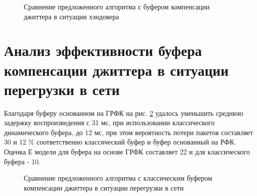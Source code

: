\pgfplotsset{width=15cm, height=10cm, compat=1.3}
\begin{figure} [!h]
  \center
{}
\caption{Сравнение предложенного алгоритма с буфером компенсации джиттера \cite{Ramjee} в ситуации хэндовера}
  \label{img4:handBuff}
\end{figure}


\section{Анализ эффективности буфера компенсации джиттера в ситуации перегрузки в сети} \label{sect4}

Благодаря буферу основанном на ГРФК на рис. \ref{img4:congBuff} удалось уменьшить среднюю задержку воспроизведения с 31 мс, при использовании классического динамического буфера, до 12 мс, при этом вероятность потери пакетов составляет 30 и 12 \% соответственно классический буфер и буфер основанный на РФК. Оценка Е модели для буфера на основе ГРФК составляет 22 и для классического буфера - 10.


\pgfplotsset{width=15cm, height=10cm, compat=1.3}
\begin{figure} [h]
  \center
{}
\caption{Сравнение предложенного алгоритма с классическим буфером компенсации джиттера в ситуации перегрузки в сети}
  \label{img4:congBuff}
\end{figure}














